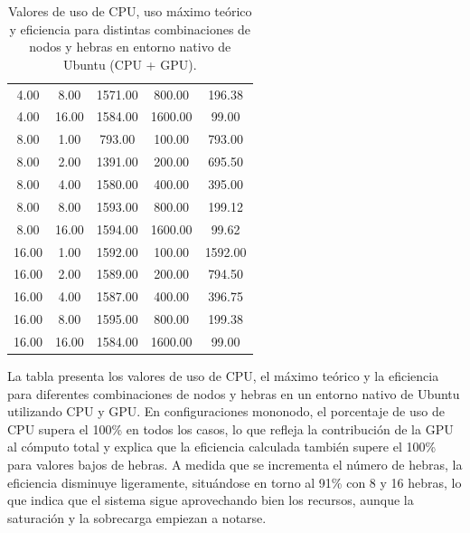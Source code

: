 \begin{table}[ht]
\begin{tabular}{|c|c|c|c|c|}
        4.00           & 8.00            & 1571.00                         & 800.00                    & 196.38                       \\
        4.00           & 16.00           & 1584.00                         & 1600.00                   & 99.00                        \\
        8.00           & 1.00            & 793.00                          & 100.00                    & 793.00                       \\
        8.00           & 2.00            & 1391.00                         & 200.00                    & 695.50                       \\
        8.00           & 4.00            & 1580.00                         & 400.00                    & 395.00                       \\
        8.00           & 8.00            & 1593.00                         & 800.00                    & 199.12                       \\
        8.00           & 16.00           & 1594.00                         & 1600.00                   & 99.62                        \\
        16.00          & 1.00            & 1592.00                         & 100.00                    & 1592.00                      \\
        16.00          & 2.00            & 1589.00                         & 200.00                    & 794.50                       \\
        16.00          & 4.00            & 1587.00                         & 400.00                    & 396.75                       \\
        16.00          & 8.00            & 1595.00                         & 800.00                    & 199.38                       \\
        16.00          & 16.00           & 1584.00                         & 1600.00                   & 99.00                        \\
        \hline
    \end{tabular}
    \caption{Valores de uso de CPU, uso máximo teórico y eficiencia para distintas combinaciones de nodos y hebras en entorno nativo de Ubuntu (CPU + GPU).}
    \label{tab:thread_sweep_ubuntu_gpu_native_cpu}
\end{table}

La tabla presenta los valores de uso de CPU, el máximo teórico y la eficiencia para diferentes combinaciones de nodos y hebras en un entorno nativo de Ubuntu utilizando CPU y GPU. En configuraciones mononodo, el porcentaje de uso de CPU supera el 100\% en todos los casos, lo que refleja la contribución de la GPU al cómputo total y explica que la eficiencia calculada también supere el 100\% para valores bajos de hebras. A medida que se incrementa el número de hebras, la eficiencia disminuye ligeramente, situándose en torno al 91\% con 8 y 16 hebras, lo que indica que el sistema sigue aprovechando bien los recursos, aunque la saturación y la sobrecarga empiezan a notarse.

